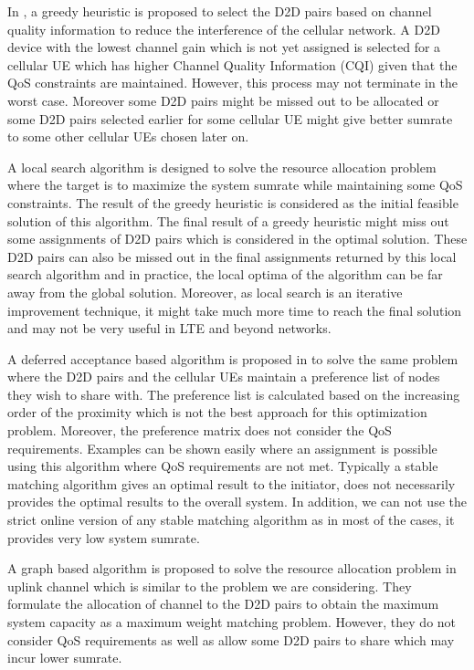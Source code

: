 \documentclass[times]{dacauth}
\begin{document}
\smallskip
\noindent
In \cite{zulhasnine}, a greedy heuristic is proposed to select the D2D pairs based on channel quality information to reduce the interference of the cellular network. A D2D device with the lowest channel gain which is not yet assigned is selected for a cellular UE which has higher Channel Quality Information (CQI) given that the QoS constraints are maintained. However, this process may not terminate in the worst case. Moreover some D2D pairs might be missed out to be allocated or some D2D pairs selected earlier for some cellular UE might give better sumrate to some other cellular UEs chosen later on. 

\smallskip
\noindent
A local search algorithm \cite{lora} is designed to solve the resource allocation problem where the target is to maximize the system sumrate while maintaining some QoS constraints. The result of the greedy heuristic \cite{zulhasnine} is considered as the initial feasible solution of this algorithm. The final result of a greedy heuristic might miss out some assignments of D2D pairs which is considered in the optimal solution. These D2D pairs can also be missed out in the final assignments returned by this local search algorithm and in practice, the local optima of the algorithm can be far away from the global solution. Moreover, as local search is an iterative improvement technique, it might take much more time to reach the final solution and may not be very useful in LTE and beyond networks.

\smallskip
\noindent
A deferred acceptance based algorithm is proposed in \cite{dara} to solve the same problem where the D2D pairs and the cellular UEs maintain a preference list of nodes they wish to share with. The preference list is calculated based on the increasing order of the proximity which is not the best approach for this optimization problem. Moreover, the preference matrix does not consider the QoS requirements. Examples can be shown easily where an assignment is possible using this algorithm where QoS requirements are not met. Typically a stable matching algorithm \cite{stable} gives an optimal result to the initiator, does not necessarily provides the optimal results to the overall system. In addition, we can not use the strict online version of any stable matching algorithm as in most of the cases, it provides very low system sumrate.

\smallskip
\noindent
A graph based algorithm \cite{zhang} is proposed to solve the resource allocation problem in uplink channel which is similar to the problem we are considering. They formulate the allocation of channel to the D2D pairs to obtain the maximum system capacity as a maximum weight matching problem. However, they do not consider QoS requirements as well as allow some D2D pairs to share which may incur lower sumrate.
 
\end{document}
